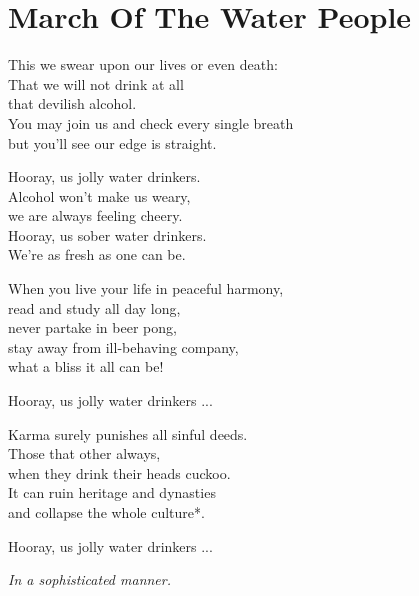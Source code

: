 \section{March Of The Water People}
This we swear upon our lives or even death:\\
That we will not drink at all\\
that devilish alcohol.\\
You may join us and check every single breath\\
but you'll see our edge is straight.

Hooray, us jolly water drinkers.\\
Alcohol won't make us weary,\\
we are always feeling cheery.\\
Hooray, us sober water drinkers.\\
We're as fresh as one can be.

When you live your life in peaceful harmony,\\
read and study all day long,\\
never partake in beer pong,\\
stay away from ill-behaving company,\\
what a bliss it all can be!

Hooray, us jolly water drinkers ...

Karma surely punishes all sinful deeds.\\
Those that other always,\\
when they drink their heads cuckoo.\\
It can ruin heritage and dynasties\\
and collapse the whole culture*.

Hooray, us jolly water drinkers ...

\textit{In a sophisticated manner.}
